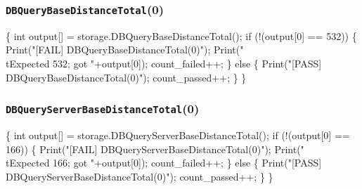 \documentclass{article}
\def\nwendcode{\endtrivlist \endgroup}
\let\nwdocspar=\par
\theoremstyle{definition}
\begin{document}
\subsubsection{{\tt{}DBQueryBaseDistanceTotal}(0)}
\nwenddocs{}\endmoddef{}
\{
  int output[] = storage.DBQueryBaseDistanceTotal();
  if (!(output[0] == 532)) \{
    Print("[FAIL] DBQueryBaseDistanceTotal(0)");
    Print("\\tExpected 532; got "+output[0]);
    count_failed++;
  \} else \{
    Print("[PASS] DBQueryBaseDistanceTotal(0)");
    count_passed++;
  \}
\}
\nwendcode{}\nwdocspar
\subsubsection{{\tt{}DBQueryServerBaseDistanceTotal}(0)}
\nwenddocs{}\endmoddef{}
\{
  int output[] = storage.DBQueryServerBaseDistanceTotal();
  if (!(output[0] == 166)) \{
    Print("[FAIL] DBQueryServerBaseDistanceTotal(0)");
    Print("\\tExpected 166; got "+output[0]);
    count_failed++;
  \} else \{
    Print("[PASS] DBQueryServerBaseDistanceTotal(0)");
    count_passed++;
  \}
\}
\nwendcode{}\nwdocspar
\end{document}
